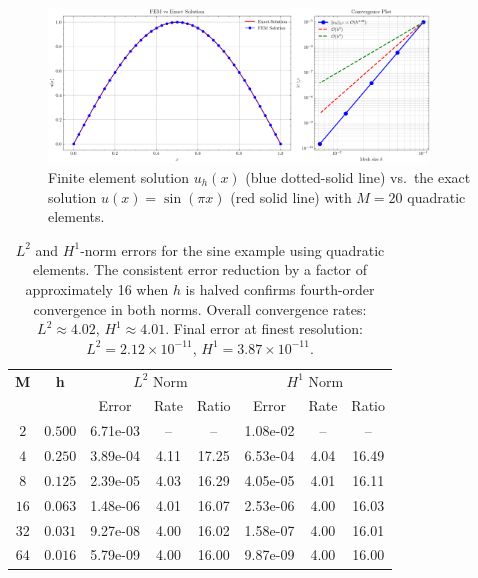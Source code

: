 \documentclass[a4paper,10pt]{article}
\begin{document}
\begin{figure}[H]
	\centering
	\includegraphics[width=0.9\textwidth]{figures/fem_plot_convergence_sine_M20.png}
	\caption{Finite element solution \(u_h(x)\) (blue dotted-solid line) vs.\ the exact
		solution \(u(x)=\sin(\pi x)\) (red solid line) with \(M=20\) quadratic elements.}
	\label{fig:solution_sine}
\end{figure}

\begin{table}[ht]
	\centering
	\begin{tabular}{|c|c|c|c|c|c|c|c|}
		\hline
		\rowcolor{blue!25!white} \textbf{M} & \textbf{h} & \multicolumn{3}{c|}{$L^2$ Norm} & \multicolumn{3}{c|}{$H^1$ Norm}                                   \\
		\cline{3-8}
		\rowcolor{blue!25!white}            &            & Error                           & Rate                            & Ratio & Error    & Rate & Ratio \\
		\hline
		$2$                                 & $0.500$    & 6.71e-03                        & --                              & --    & 1.08e-02 & --   & --    \\
		\rowcolor{blue!5!white}
		$4$                                 & $0.250$    & 3.89e-04                        & 4.11                            & 17.25 & 6.53e-04 & 4.04 & 16.49 \\
		$8$                                 & $0.125$    & 2.39e-05                        & 4.03                            & 16.29 & 4.05e-05 & 4.01 & 16.11 \\
		\rowcolor{blue!5!white}
		$16$                                & $0.063$    & 1.48e-06                        & 4.01                            & 16.07 & 2.53e-06 & 4.00 & 16.03 \\
		$32$                                & $0.031$    & 9.27e-08                        & 4.00                            & 16.02 & 1.58e-07 & 4.00 & 16.01 \\
		\rowcolor{blue!5!white}
		$64$                                & $0.016$    & 5.79e-09                        & 4.00                            & 16.00 & 9.87e-09 & 4.00 & 16.00 \\
		\hline
	\end{tabular}
	\caption{$L^2$ and $H^1$-norm errors for the sine example using quadratic elements. The consistent error reduction by a factor of approximately 16 when $h$ is halved confirms fourth-order convergence in both norms. Overall convergence rates: $L^2 \approx 4.02$, $H^1 \approx 4.01$. Final error at finest resolution: $L^2 = 2.12 \times 10^{-11}$, $H^1 = 3.87 \times 10^{-11}$.}
	\label{tab:convergence_fancy}
\end{table}
\end{document}
